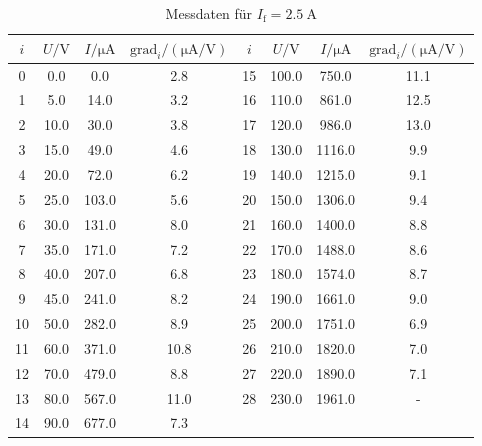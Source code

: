 \begin{table}
    \centering
    \begin{tabular}{S[table-format=:.0] S S S S[table-format=:.0] S S S}
        \toprule
        {$i$} &
        {$U / \unit{\volt}$} &
        {$I/ \unit{\micro\ampere}$} &
        {$\text{grad}_i/ (\unit{\micro\ampere\per\volt})$} &
        {$i$} &
        {$U / \unit{\volt}$} &
        {$I/ \unit{\micro\ampere}$} &
        {$\text{grad}_i/ (\unit{\micro\ampere\per\volt})$} \\
            & 0.0      & 0.0       & 2.8   &        15   & 100.0    & 750.0     & 11.1   \\
        1    & 5.0      & 14.0      & 3.2   &        16   & 110.0    & 861.0     & 12.5   \\
        2    & 10.0     & 30.0      & 3.8   &        17   & 120.0    & 986.0     & 13.0   \\
        3    & 15.0     & 49.0      & 4.6   &        18   & 130.0    & 1116.0    & 9.9    \\
        4    & 20.0     & 72.0      & 6.2   &        19   & 140.0    & 1215.0    & 9.1    \\
        5    & 25.0     & 103.0     & 5.6   &        20   & 150.0    & 1306.0    & 9.4    \\
        6    & 30.0     & 131.0     & 8.0   &        21   & 160.0    & 1400.0    & 8.8    \\
        7    & 35.0     & 171.0     & 7.2   &        22   & 170.0    & 1488.0    & 8.6    \\
        8    & 40.0     & 207.0     & 6.8   &        23   & 180.0    & 1574.0    & 8.7    \\
        9    & 45.0     & 241.0     & 8.2   &        24   & 190.0    & 1661.0    & 9.0    \\
        10   & 50.0     & 282.0     & 8.9   &        25   & 200.0    & 1751.0    & 6.9    \\
        11   & 60.0     & 371.0     & 10.8  &        26   & 210.0    & 1820.0    & 7.0    \\
        12   & 70.0     & 479.0     & 8.8   &        27   & 220.0    & 1890.0    & 7.1    \\
        13   & 80.0     & 567.0     & 11.0  &        28   & 230.0    & 1961.0    & {-}    \\
        14   & 90.0     & 677.0     & 7.3   & & & & \\

        \bottomrule
    \end{tabular}
    \caption{Messdaten für $I_\text{f}= \qty{2.5}{\ampere}$}
    \label{tab:c03}
\end{table}
